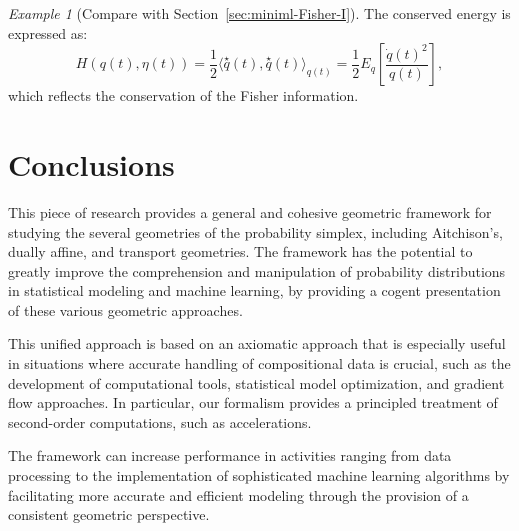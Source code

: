 \documentclass[axioms,article,submit,pdftex,moreauthors]{Definitions/mdpi}
\theoremstyle{plain}
\theoremstyle{remark}
\newtheorem{myexample}{Example}
\begin{document}
\begin{myexample}[Compare with Section~\ref{sec:miniml-Fisher-I}]
The conserved energy is expressed as:
\begin{equation*} 
H(q(t), \eta(t)) = \frac{1}{2} \langle \overset{\star}{q}(t), \overset{\star}{q}(t) \rangle_{q(t)} = \frac{1}{2} E_q \left[ \frac{\dot{q}(t)^2}{q(t)} \right],
\end{equation*} 
which reflects the conservation of the Fisher information.
\end{myexample}

\section{Conclusions}

This piece of research provides a general and cohesive geometric framework for studying the several geometries of the probability simplex, including Aitchison's, dually affine, and transport geometries. The framework has the potential to greatly improve the comprehension and manipulation of probability distributions in statistical modeling and machine learning, by providing a cogent presentation of these various geometric approaches.

This unified approach is based on an axiomatic approach that is especially useful in situations where accurate handling of compositional data is crucial, such as the development of computational tools, statistical model optimization, and gradient flow approaches. In particular, our formalism provides a principled treatment of second-order computations, such as accelerations. 

The framework can increase performance in activities ranging from data processing to the implementation of sophisticated machine learning algorithms by facilitating more accurate and efficient modeling through the provision of a consistent geometric perspective.





\end{document}

